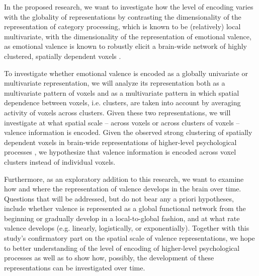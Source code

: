 \documentclass[12pt,a4paper]{article}\usepackage[]{graphicx}\usepackage[]{color}
\begin{document}
In the proposed research, we want to investigate how the level of encoding varies with the globality of representations by contrasting the dimensionality of the representation of category processing, which is known to be (relatively) local multivariate, with the dimensionality of the representation of emotional valence, as emotional valence is known to robustly elicit a brain-wide network of highly clustered, spatially dependent voxels \citep{lindquist2015,chavez2015,kassam2013,oosterwijk2015}.     

To investigate whether emotional valence is encoded as a globally univariate or multivariate representation, we will analyze its representation both as a multivariate pattern of voxels and as a multivariate pattern in which spatial dependence between voxels, i.e. clusters, are taken into account by averaging activity of voxels across clusters. Given these two representations, we will investigate at what spatial scale -- across voxels or across clusters of voxels -- valence information is encoded.  Given the observed strong clustering of spatially dependent voxels in brain-wide representations of higher-level psychological processes \citep{kassam2013,oosterwijk2015,baucom2012}, we hypothesize that valence information is encoded across voxel clusters instead of individual voxels. %

Furthermore, as an exploratory addition to this research, we want to examine how and where the representation of valence develops in the brain over time. Questions that will be addressed, but do not bear any a priori hypotheses, include whether valence is represented as a global functional network from the beginning or gradually develop in a local-to-global fashion, and at what rate valence develops (e.g. linearly, logistically, or exponentially). Together with this study's confirmatory part on the spatial scale of valence representations, we hope to better understanding of the level of encoding of higher-level psychological processes as well as to show how, possibly, the development of these representations can be investigated over time.\\
\end{document}

